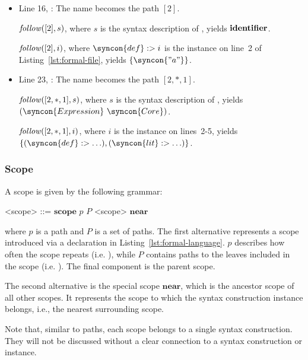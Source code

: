\documentclass{kththesis}
\begin{document}
\begin{itemize}
  \item Line 16, : The name  becomes the path $[2]$.

  $\mathit{follow}([2], s)$, where $s$ is the syntax description of , yields $\mathrel{\mathbf{identifier}}$.

  $\mathit{follow}([2], i)$, where $\syncon{def} :> i$ is the  instance on line~2 of Listing~\ref{lst:formal-file}, yields $\{\syncon{"a"}\}$.

  \item Line 23, : The name  becomes the path $[2, *, 1]$.

  $\mathit{follow}([2, *, 1], s)$, where $s$ is the syntax description of , yields $(\syncon{Expression}\ \syncon{Core})$.

  $\mathit{follow}([2, *, 1], i)$, where $i$ is the  instance on lines~2-5, yields $\{(\syncon{def} :> \ldots), (\syncon{lit} :> \ldots)\}$.
\end{itemize}

\subsubsection{Scope}

\newcommand{\near}{\ensuremath{\mathrel{\mathbf{near}}}}
\newcommand{\scope}{\ensuremath{\mathrel{\mathbf{scope}}}}

A scope is given by the following grammar:

\begin{grammar}
<scope> ::= $\scope$ $p$ $P$ <scope>
  \alt $\near$
\end{grammar}

where $p$ is a path and $P$ is a set of paths. The first alternative represents a scope introduced via a declaration  in Listing~\ref{lst:formal-language}. $p$ describes how often the scope repeats (i.e. ), while $P$ contains paths to the leaves included in the scope (i.e. ). The final component is the parent scope.

The second alternative is the special scope $\near$, which is the ancestor scope of all other scopes. It represents the scope to which the syntax construction instance belongs, i.e., the nearest surrounding scope.

Note that, similar to paths, each scope belongs to a single syntax construction. They will not be discussed without a clear connection to a syntax construction or instance.
\end{document}
